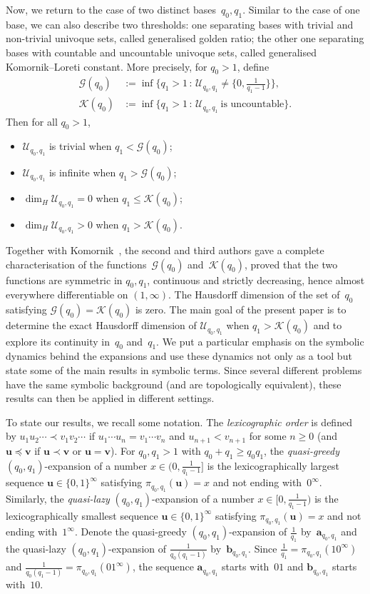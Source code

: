 \documentclass{amsart}
\theoremstyle{definition}
\numberwithin{equation}{section}
\newcommand{\ba}{\mathbf{a}}
\newcommand{\bb}{\mathbf{b}}
\newcommand{\bu}{\mathbf{u}}
\newcommand{\bv}{\mathbf{v}}
\newcommand{\cG}{\mathcal{G}}
\newcommand{\cK}{\mathcal{K}}
\newcommand{\cU}{\mathcal{U}}
\begin{document}
Now, we return to the case of two distinct bases~$q_0,q_1$. 
Similar to the case of one base, we can also describe two thresholds: one separating bases with trivial and non-trivial univoque sets, called generalised golden ratio; the other one separating bases with countable and uncountable univoque
sets, called generalised Komornik–Loreti constant. 
More precisely, for $q_0 > 1$, define
\[
\begin{aligned}
\cG(q_0) & := \inf\big\{q_1 > 1 \,:\, \cU_{q_0, q_1} \neq \big\{0, \tfrac{1}{q_1-1}\big\}\big\}, \\
\cK(q_0) & := \inf \big\{q_1 > 1 \,:\, \cU_{q_0, q_1}\ \text{is uncountable}\big\}.
\end{aligned}
\]
Then for all $q_0>1$,
\begin{itemize}
\item 
$\cU_{q_0, q_1}$ is trivial when $q_1 < \cG(q_0)$;
\item 
$\cU_{q_0, q_1}$ is infinite when $q_1 > \cG(q_0)$;
\item 
$\dim_H\cU_{q_0, q_1} = 0$  when $q_1 \le \cK(q_0)$;
\item 
$\dim_H\cU_{q_0, q_1}>0$  when $q_1>\cK(q_0)$.	 
\end{itemize}
Together with Komornik~\cite{KomSteZou2022}, the second and third authors gave a complete characterisation of the functions~$\cG(q_0)$ and~$\cK(q_0)$, proved that the two functions are  symmetric in $q_0,q_1$, continuous and strictly decreasing, hence almost everywhere differentiable on $(1,\infty)$. 
The Hausdorff dimension of the set of~$q_0$ satisfying $\cG(q_0) = \cK(q_0)$  is zero.
The main goal of the present paper is to determine the exact Hausdorff dimension of $\cU_{q_0, q_1}$ when $q_1 > \cK(q_0)$ and to explore its continuity in~$q_0$ and~$q_1$.
We put a particular emphasis on the symbolic dynamics behind the expansions and use these dynamics not only as a tool but state some of the main results in symbolic terms.
Since several different problems have the same symbolic background (and are topologically equivalent), these results can then be applied in different settings. 

To state our results, we recall some notation.
The \emph{lexicographic order} is defined by $u_1u_2\cdots \prec v_1v_2\cdots$ if $u_1\cdots u_n = v_1\cdots v_n$ and $u_{n+1} < v_{n+1}$ for some $n \ge 0$ (and $\bu \preceq \bv$ if $\bu \prec \bv$ or $\bu = \bv$). 
For $q_0,q_1>1$ with $q_0{+}q_1 \ge q_0q_1$, the \emph{quasi-greedy} $(q_0,q_1)$-expansion of a number $x \in (0,\frac{1}{q_1-1}]$ is the lexicographically largest sequence $\bu \in \{0,1\}^\infty$ satisfying $\pi_{q_0,q_1}(\bu) = x$ and not ending with~$0^\infty$. 
Similarly, the \emph{quasi-lazy} $(q_0,q_1)$-expansion of a number $x \in [0,\frac{1}{q_1-1})$ is the lexicographically smallest sequence $\bu \in \{0,1\}^\infty$ satisfying $\pi_{q_0,q_1}(\bu) = x$ and not ending with~$1^\infty$. 
Denote the quasi-greedy $(q_0,q_1)$-expansion of $\frac{1}{q_1}$ by~$\ba_{q_0,q_1}$ and the quasi-lazy $(q_0,q_1)$-expansion of $\frac{1}{q_0(q_1-1)}$ by~$\bb_{q_0,q_1}$.
Since $\frac{1}{q_1} = \pi_{q_0,q_1}(10^\infty)$ and $\frac{1}{q_0(q_1-1)} = \pi_{q_0,q_1}(01^\infty)$, the sequence $\ba_{q_0,q_1}$ starts with~$01$ and $\bb_{q_0,q_1}$ starts with~$10$.
\end{document}
